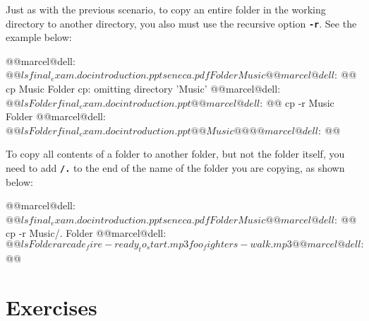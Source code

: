 Just as with the previous scenario, to copy an entire folder in the working directory to another directory, you also must use the recursive option \textbf{\texttt{-r}}. See the example below:
\begin{command_line}[Bash]
@@marcel@dell:~$@@ ls
final_exam.doc  introduction.ppt  seneca.pdf
Folder  Music
@@marcel@dell:~$@@ cp Music Folder
cp: omitting directory 'Music'
@@marcel@dell:~$@@ ls Folder
final_exam.doc  introduction.ppt
@@marcel@dell:~$@@ cp -r Music Folder
@@marcel@dell:~$@@ ls Folder
final_exam.doc  introduction.ppt  @@Music@@
@@marcel@dell:~$@@
\end{command_line}

To copy all contents of a folder to another folder, but not the folder itself, you need to add \textbf{\texttt{/.}} to the end of the name of the folder you are copying, as shown below:
\begin{command_line}[Bash]
@@marcel@dell:~$@@ ls
final_exam.doc  introduction.ppt  seneca.pdf
Folder  Music
@@marcel@dell:~$@@ cp -r Music/. Folder
@@marcel@dell:~$@@ ls Folder
arcade_fire-ready_to_start.mp3  foo_fighters-walk.mp3
@@marcel@dell:~$@@
\end{command_line}


\section*{Exercises}

